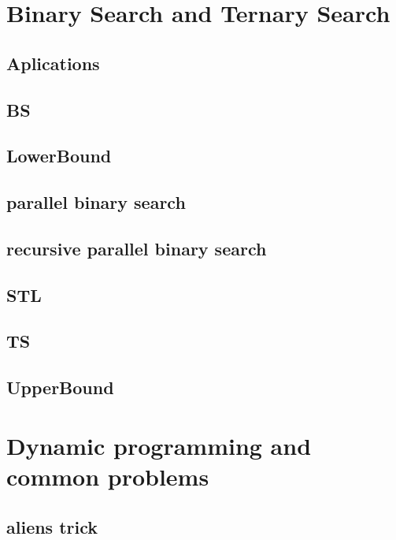 \section{Binary Search and Ternary Search}
\subsection{Aplications}
\raggedbottom
\hrulefill
\subsection{BS}
\raggedbottom
\hrulefill
\subsection{LowerBound}
\raggedbottom
\hrulefill
\subsection{parallel binary search}
\raggedbottom
\hrulefill
\subsection{recursive parallel binary search}
\raggedbottom
\hrulefill
\subsection{STL}
\raggedbottom
\hrulefill
\subsection{TS}
\raggedbottom
\hrulefill
\subsection{UpperBound}
\raggedbottom
\hrulefill

\section{Dynamic programming and common problems}
\subsection{aliens trick}
\raggedbottom
\hrulefill
